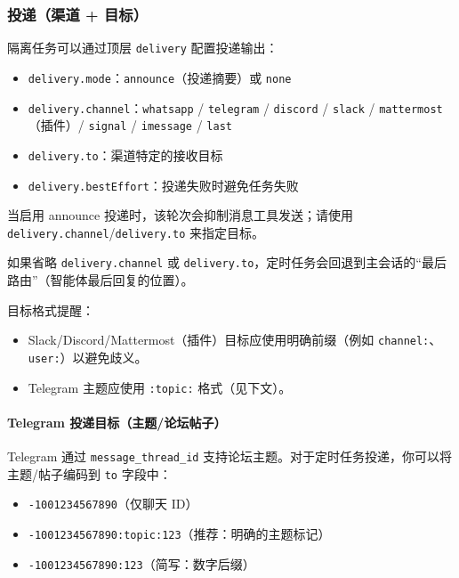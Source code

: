 \subsubsection{投递（渠道 + 目标）}


隔离任务可以通过顶层 \texttt{delivery} 配置投递输出：

\begin{itemize}
  \item \texttt{delivery.mode}：\texttt{announce}（投递摘要）或 \texttt{none}
  \item \texttt{delivery.channel}：\texttt{whatsapp} / \texttt{telegram} / \texttt{discord} / \texttt{slack} / \texttt{mattermost}（插件）/ \texttt{signal} / \texttt{imessage} / \texttt{last}
  \item \texttt{delivery.to}：渠道特定的接收目标
  \item \texttt{delivery.bestEffort}：投递失败时避免任务失败
\end{itemize}


当启用 announce 投递时，该轮次会抑制消息工具发送；请使用 \texttt{delivery.channel}/\texttt{delivery.to} 来指定目标。

如果省略 \texttt{delivery.channel} 或 \texttt{delivery.to}，定时任务会回退到主会话的“最后路由”（智能体最后回复的位置）。

目标格式提醒：

\begin{itemize}
  \item Slack/Discord/Mattermost（插件）目标应使用明确前缀（例如 \texttt{channel:}、\texttt{user:}）以避免歧义。
  \item Telegram 主题应使用 \texttt{:topic:} 格式（见下文）。
\end{itemize}


\paragraph{Telegram 投递目标（主题/论坛帖子）}


Telegram 通过 \texttt{message\_thread\_id} 支持论坛主题。对于定时任务投递，你可以将主题/帖子编码到 \texttt{to} 字段中：

\begin{itemize}
  \item \texttt{-1001234567890}（仅聊天 ID）
  \item \texttt{-1001234567890:topic:123}（推荐：明确的主题标记）
  \item \texttt{-1001234567890:123}（简写：数字后缀）
\end{itemize}


